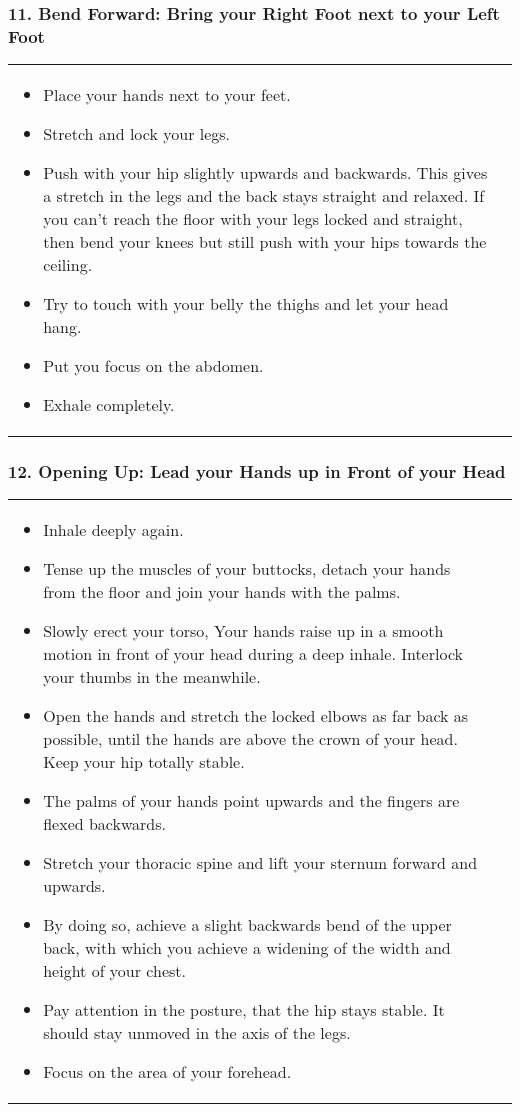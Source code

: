 \documentclass[../Book.Stress_regulation.tex]{subfiles}
\begin{document}
\subsubsection{11. Bend Forward: Bring your Right Foot next to your Left Foot}
\begin{tabular}{p{9.7cm} p{1.8cm}}

\begin{itemize}
\item Place your hands next to your feet.
\item Stretch and lock your legs.
\item Push with your hip slightly upwards and backwards. This gives a stretch in the legs and the back stays straight and relaxed.
  If you can't reach the floor with your legs locked and straight, then bend your knees but still push with your hips towards the ceiling.
\item Try to touch with your belly the thighs and let your head hang.
\item Put you focus on the abdomen.
\item Exhale completely.
\end{itemize}
    &
    \raisebox{-1.2\totalheight}{\texttt{[image: SS\_ForwardBend]}}
  
\end{tabular}

\subsubsection{12. Opening Up: Lead your Hands up in Front of your Head}

\begin{tabular}{p{9.7cm} p{1.8cm}}
  
\begin{itemize}
\item Inhale deeply again.
\item Tense up the muscles of your buttocks, detach your hands from the floor and join your hands with the palms.
\item Slowly erect your torso, Your hands raise up in a smooth motion in front of your head during a deep inhale.
  Interlock your thumbs in the meanwhile.
\item Open the hands and stretch the locked elbows as far back as possible, until the hands are above the crown of your head. Keep your hip totally stable.
\item The palms of your hands point upwards and the fingers are flexed backwards.
\item Stretch your thoracic spine and lift your sternum forward and upwards.
\item By doing so, achieve a slight backwards bend of the upper back, with which you achieve a widening of the width and height of your chest.
\item Pay attention in the posture, that the hip stays stable. It should stay unmoved in the axis of the legs.
\item Focus on the area of your forehead.
\end{itemize}
  &
    \raisebox{-1.2\totalheight}{\texttt{[image: SS\_Opening]}}
  
\end{tabular}
\end{document}
